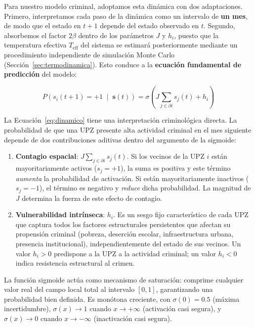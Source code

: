 \documentclass[12pt,a4paper]{article}
\begin{document}
Para nuestro modelo criminal, adoptamos esta dinámica con dos adaptaciones. Primero, interpretamos cada paso de la dinámica como un intervalo de \textbf{un mes}, de modo que el estado en $t+1$ depende del estado observado en $t$. Segundo, absorbemos el factor $2\beta$ dentro de los parámetros $J$ y $h_i$, puesto que la temperatura efectiva $T_{\text{eff}}$ del sistema se estimará posteriormente mediante un procedimiento independiente de simulación Monte Carlo (Sección~\ref{sec:termodinamica}). Esto conduce a la \textbf{ecuación fundamental de predicción} del modelo:

\begin{equation}\label{eq:dinamico}
\boxed{P\left(s_i(t+1) = +1 \;\middle|\; \mathbf{s}(t)\right) = 
       \sigma\!\left(J \sum_{j \in \partial i} s_j(t) + h_i\right)}
\end{equation}

La Ecuación~\ref{eq:dinamico} tiene una interpretación criminológica directa. La probabilidad de que una UPZ presente alta actividad criminal en el mes siguiente depende de dos contribuciones aditivas dentro del argumento de la sigmoide:

\begin{enumerate}[label=\alph*)]
    \item \textbf{Contagio espacial}: $J \sum_{j \in \partial i} s_j(t)$. Si los vecinos de la UPZ $i$ están mayoritariamente activos ($s_j = +1$), la suma es positiva y este término \textit{aumenta} la probabilidad de activación. Si están mayoritariamente inactivos ($s_j = -1$), el término es negativo y \textit{reduce} dicha probabilidad. La magnitud de $J$ determina la fuerza de este efecto de contagio.
    
    \item \textbf{Vulnerabilidad intrínseca}: $h_i$. Es un sesgo fijo característico de cada UPZ que captura todos los factores estructurales persistentes que afectan su propensión criminal (pobreza, deserción escolar, infraestructura urbana, presencia institucional), independientemente del estado de sus vecinos. Un valor $h_i > 0$ predispone a la UPZ a la actividad criminal; un valor $h_i < 0$ indica resistencia estructural al crimen.
\end{enumerate}

La función sigmoide actúa como mecanismo de saturación: comprime cualquier valor real del campo local total al intervalo $[0,1]$, garantizando una probabilidad bien definida. Es monótona creciente, con $\sigma(0) = 0.5$ (máxima incertidumbre), $\sigma(x) \to 1$ cuando $x \to +\infty$ (activación casi segura), y $\sigma(x) \to 0$ cuando $x \to -\infty$ (inactivación casi segura).
\end{document}
